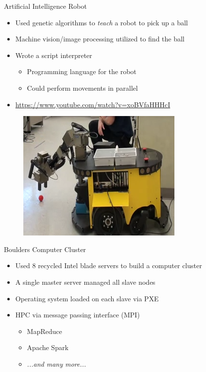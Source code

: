 \documentclass{beamer}
\begin{document}
\begin{frame}{Artificial Intelligence Robot}
\begin{itemize}
	\item Used genetic algorithms to \emph{teach} a robot to pick up a ball
	\item Machine vision/image processing utilized to find the ball
	\item Wrote a script interpreter
	\begin{itemize}
		\item Programming language for the robot
		\item Could perform movements in parallel
	\end{itemize}
	\item \url{https://www.youtube.com/watch?v=xoBVfaHHHcI}
\end{itemize}
\begin{figure}
	\includegraphics[width=.45\linewidth]{img/robot.png}
\end{figure}
\end{frame}

\begin{frame}{Boulders Computer Cluster}
\begin{itemize}
	\item Used 8 recycled Intel blade servers to build a computer cluster
	\item A single master server managed all slave nodes
	\item Operating system loaded on each slave via PXE
	\item HPC via message passing interface (MPI)
	\begin{itemize}
		\item MapReduce
		\item Apache Spark
		\item \emph{...and many more...}
	\end{itemize}
\end{itemize}
\end{frame}
\end{document}
